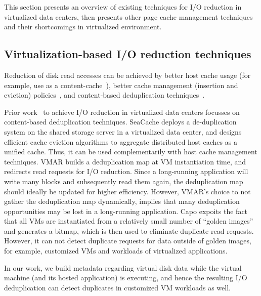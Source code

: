 
% 





This section presents an overview
of existing techniques for I/O reduction in virtualized data centers,
then presents other page cache management techniques and their
shortcomings in virtualized environment.

\subsection{Virtualization-based I/O reduction techniques}
Reduction of disk read accesses can be achieved by 
better host cache usage (for example, use as a content-cache~\cite{iodedup}),
better cache management 
(insertion and eviction) policies~\cite{outperforming-LRU}, 
and content-based deduplication techniques~\cite{VMAR}.

Prior work~\cite{cooperative, VMAR, capo} to achieve I/O reduction in 
virtualized data centers focusses on content-based deduplication techniques.
SeaCache\cite{cooperative} deploys a de-duplication
system on the shared storage server in a virtualized data center, and
designs efficient cache eviction algorithms to aggregate distributed
host caches as a unified cache. Thus, it can be used
complementarily with host cache management techniques.
VMAR\cite{VMAR} builds a deduplication map at VM instantiation
time, and redirects read requests for I/O reduction.
Since a long-running application will write many blocks and subsequently
read them again, the deduplication map should ideally be updated for
higher efficiency. However, VMAR's choice to not gather the deduplication 
map dynamically, implies that many
deduplication opportunities may be lost in a long-running application.
Capo\cite{capo} expoits the fact that all VMs are instantiated
from a relatively small number of ``golden images'' and generates a bitmap,
which is then used to eliminate duplicate read requests. However, it
can not detect duplicate requests for data outside of golden images,
for example, customized VMs and workloads of
virtualized applications.

In our work, we build metadata regarding virtual disk data while
the virtual machine (and its hosted application) is executing, and hence
the resulting I/O deduplication can detect duplicates in customized
VM workloads as well.

